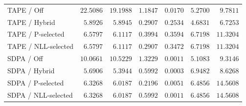 \begin{table}[tb]
\begin{tabular}{l*{6}{r}}
\addlinespace[3pt]
TAPE / Off & $22.5086$ & $19.1988$ & $1.1847$ & $0.0170$ & $5.2700$ & $9.7811$ \\
TAPE / Hybrid & $5.8926$ & $5.8945$ & $0.2907$ & $0.2534$ & $4.6831$ & $6.7253$ \\
TAPE / P-selected & $6.5797$ & $6.1117$ & $0.3994$ & $0.3594$ & $6.7198$ & $11.3204$ \\
TAPE / NLL-selected & $6.5797$ & $6.1117$ & $0.2907$ & $0.3472$ & $6.7198$ & $11.3204$ \\
\addlinespace[3pt]
SDPA / Off & $10.0661$ & $10.5229$ & $1.3229$ & $0.0011$ & $5.1083$ & $9.3146$ \\
SDPA / Hybrid & $5.6906$ & $5.3944$ & $0.5992$ & $0.0003$ & $6.9482$ & $8.6268$ \\
SDPA / P-selected & $6.3268$ & $6.0187$ & $0.2196$ & $0.0051$ & $6.4856$ & $14.5608$ \\
SDPA / NLL-selected & $6.3268$ & $6.0187$ & $0.5992$ & $0.0011$ & $6.4856$ & $14.5608$ \\
\bottomrule
\end{tabular}
\end{table}
